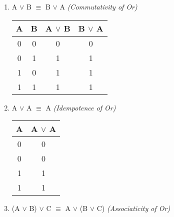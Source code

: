 \documentclass[12pt]{article}
\begin{document}
\begin{enumerate}



  \item A $\lor$ B $\equiv$ B $\lor$ A \emph{(Commutativity of Or)}



\begin{center}

  \begin{tabular}{| c | c | c | c |}

    \hline

    A & B & A $\lor$ B & B $\lor$ A\\ \hline

    0 & 0 & 0 & 0 \\

    0 & 1 & 1 & 1 \\

    1 & 0 & 1 & 1 \\

    1 & 1 & 1 & 1 \\ \hline

  \end{tabular}

\end{center}



\item A $\lor$ A $\equiv$ A \emph{(Idempotence of Or)}



\begin{center}

  \begin{tabular}{| c | c |}

    \hline

    A & A $\lor$ A \\ \hline

    0 & 0 \\

    0 & 0 \\

    1 & 1 \\

    1 & 1 \\ \hline

  \end{tabular}

\end{center}



  \item (A $\lor$ B) $\lor$ C $\equiv$ A $\lor$ (B $\lor$ C) \emph{(Associaticity of Or)}




\end{enumerate}
\end{document}
